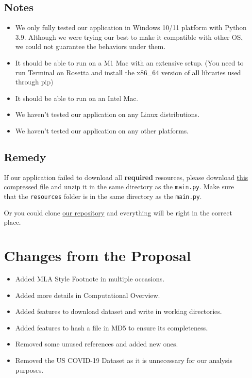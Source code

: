 \documentclass[fontsize=11pt]{article}
\begin{document}
    \subsection{Notes}

    \begin{itemize}
        \item We only fully tested our application in Windows 10/11 platform with Python 3.9. Although we were trying our best to make it compatible with other OS, we could not guarantee the behaviors under them.
        \item It should be able to run on a M1 Mac with an extensive setup. (You need to run Terminal on Rosetta and install the x86\_64 version of all libraries used through pip)
        \item It should be able to run on an Intel Mac.
        \item We haven't tested our application on any Linux distributions.
        \item We haven't tested our application on any other platforms.
    \end{itemize}

    \subsection{Remedy}

    If our application failed to download all \textbf{required} resources, please download \href{https://github.com/UofT-CS-Group/CSC110-Final-Project/raw/main/Report/remedy.zip}{this compressed file} and unzip it in the same directory as the \verb|main.py|. Make sure that the \verb|resources| folder is in the same directory as the \verb|main.py|.

    Or you could clone \href{https://github.com/UofT-CS-Group/CSC110-Final-Project}{our repository} and everything will be right in the correct place.

    \section{Changes from the Proposal}

    \begin{itemize}
        \item Added MLA Style Footnote in multiple occasions.
        \item Added more details in Computational Overview.
        \item Added features to download dataset and write in working directories.
        \item Added features to hash a file in MD5 to ensure its completeness.
        \item Removed some unused references and added new ones.
        \item Removed the US COVID-19 Dataset as it is unnecessary for our analysis purposes.
    \end{itemize}
\end{document}
